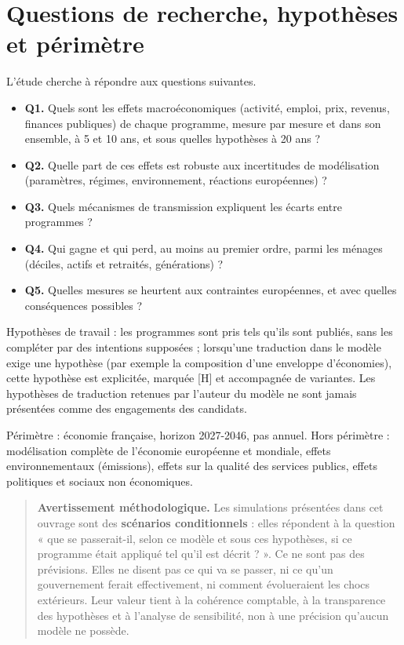\documentclass[
  11pt,
  11pt,
  a4paper,
  openany]{book}
\providecommand{\tightlist}{%
  \setlength{\itemsep}{0pt}\setlength{\parskip}{0pt}}
\begin{document}
\hypertarget{sec:questions}{%
\section{Questions de recherche, hypothèses et
périmètre}\label{sec:questions}}

L'étude cherche à répondre aux questions suivantes.

\begin{itemize}
\tightlist
\item
  \textbf{Q1.} Quels sont les effets macroéconomiques (activité, emploi,
  prix, revenus, finances publiques) de chaque programme, mesure par
  mesure et dans son ensemble, à 5 et 10 ans, et sous quelles hypothèses
  à 20 ans ?
\item
  \textbf{Q2.} Quelle part de ces effets est robuste aux incertitudes de
  modélisation (paramètres, régimes, environnement, réactions
  européennes) ?
\item
  \textbf{Q3.} Quels mécanismes de transmission expliquent les écarts
  entre programmes ?
\item
  \textbf{Q4.} Qui gagne et qui perd, au moins au premier ordre, parmi
  les ménages (déciles, actifs et retraités, générations) ?
\item
  \textbf{Q5.} Quelles mesures se heurtent aux contraintes européennes,
  et avec quelles conséquences possibles ?
\end{itemize}

Hypothèses de travail : les programmes sont pris tels qu'ils sont
publiés, sans les compléter par des intentions supposées ; lorsqu'une
traduction dans le modèle exige une hypothèse (par exemple la
composition d'une enveloppe d'économies), cette hypothèse est
explicitée, marquée {[}H{]} et accompagnée de variantes. Les hypothèses
de traduction retenues par l'auteur du modèle ne sont jamais présentées
comme des engagements des candidats.

Périmètre : économie française, horizon 2027-2046, pas annuel. Hors
périmètre : modélisation complète de l'économie européenne et mondiale,
effets environnementaux (émissions), effets sur la qualité des services
publics, effets politiques et sociaux non économiques.

\begin{quote}
\textbf{Avertissement méthodologique.} Les simulations présentées dans
cet ouvrage sont des \textbf{scénarios conditionnels} : elles répondent
à la question « que se passerait-il, selon ce modèle et sous ces
hypothèses, si ce programme était appliqué tel qu'il est décrit ? ». Ce
ne sont pas des prévisions. Elles ne disent pas ce qui va se passer, ni
ce qu'un gouvernement ferait effectivement, ni comment évolueraient les
chocs extérieurs. Leur valeur tient à la cohérence comptable, à la
transparence des hypothèses et à l'analyse de sensibilité, non à une
précision qu'aucun modèle ne possède.
\end{quote}
\end{document}
